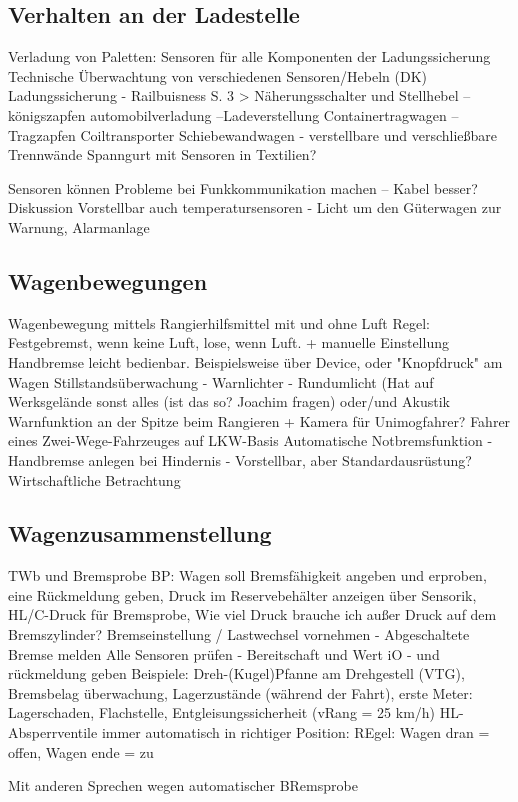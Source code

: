 \subsection{Verhalten an der Ladestelle}

Verladung von Paletten:
Sensoren für alle Komponenten der Ladungssicherung
Technische Überwachtung von verschiedenen Sensoren/Hebeln (DK) Ladungssicherung - Railbuisness S. 3 > Näherungsschalter und Stellhebel -- königszapfen
automobilverladung --Ladeverstellung
Containertragwagen -- Tragzapfen
Coiltransporter
Schiebewandwagen - verstellbare und verschließbare Trennwände
Spanngurt mit Sensoren in Textilien?

Sensoren können Probleme bei Funkkommunikation machen -- Kabel besser? Diskussion
Vorstellbar auch temperatursensoren - Licht um den Güterwagen zur Warnung, Alarmanlage
\subsection{Wagenbewegungen}
Wagenbewegung mittels Rangierhilfsmittel 
mit und ohne Luft
Regel: Festgebremst, wenn keine Luft, lose, wenn Luft. + manuelle Einstellung
Handbremse leicht bedienbar. Beispielsweise über Device, oder "Knopfdruck" am Wagen
Stillstandsüberwachung - Warnlichter - Rundumlicht (Hat auf Werksgelände sonst alles (ist das so? Joachim fragen) oder/und Akustik
Warnfunktion an der Spitze beim Rangieren + Kamera für Unimogfahrer? Fahrer eines Zwei-Wege-Fahrzeuges auf LKW-Basis
Automatische Notbremsfunktion - Handbremse anlegen bei Hindernis - Vorstellbar, aber Standardausrüstung? Wirtschaftliche Betrachtung
\subsection{Wagenzusammenstellung}
TWb und Bremsprobe
BP: Wagen soll Bremsfähigkeit angeben und erproben, eine Rückmeldung geben, Druck im Reservebehälter anzeigen über Sensorik, HL/C-Druck für Bremsprobe, Wie viel Druck brauche ich außer Druck auf dem Bremszylinder?
Bremseinstellung / Lastwechsel vornehmen - Abgeschaltete Bremse melden
Alle Sensoren prüfen - Bereitschaft und Wert iO - und rückmeldung geben
Beispiele: Dreh-(Kugel)Pfanne am Drehgestell (VTG), Bremsbelag überwachung, Lagerzustände (während der Fahrt), erste Meter: Lagerschaden, Flachstelle, Entgleisungssicherheit (vRang = 25 km/h)
HL-Absperrventile immer automatisch in richtiger Position: REgel: Wagen dran = offen, Wagen ende = zu

Mit anderen Sprechen wegen automatischer BRemsprobe
